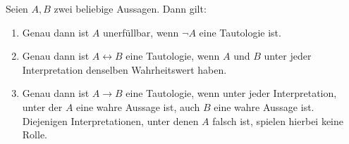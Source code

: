  
\begin{satz} \label{tauto}
    Seien $A,B$ zwei beliebige Aussagen. Dann gilt:
    \begin{enumerate}
        \item Genau dann ist $A$ unerfüllbar, wenn $\neg A$ eine Tautologie ist.
        \item Genau dann ist $A\leftrightarrow B$ eine Tautologie, wenn $A$ und $B$ unter jeder Interpretation denselben Wahrheitswert haben.
        \item Genau dann ist $A\to B$ eine Tautologie, wenn unter jeder Interpretation, unter der $A$ eine wahre Aussage ist, auch $B$ eine wahre Aussage ist. Diejenigen Interpretationen, unter denen $A$ falsch ist, spielen hierbei keine Rolle.
    \end{enumerate}
\end{satz}


